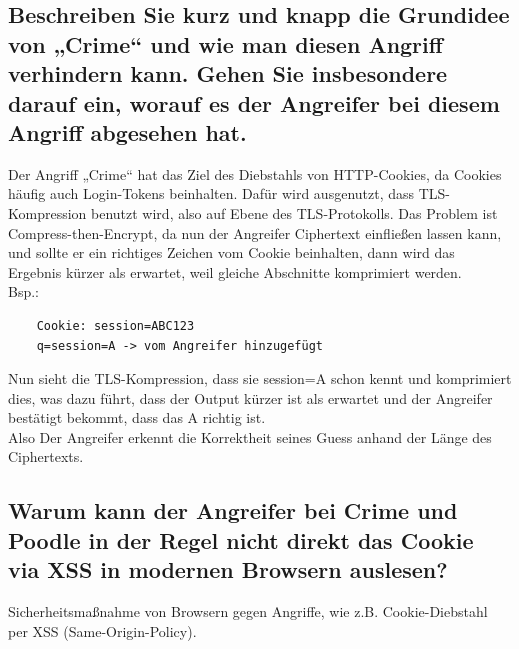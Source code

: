 \subsection{Beschreiben Sie kurz und knapp die Grundidee von „Crime“ und wie man diesen Angriff verhindern kann. Gehen Sie insbesondere darauf ein, worauf es der Angreifer bei diesem Angriff abgesehen hat.}
Der Angriff „Crime“ hat das Ziel des Diebstahls von HTTP-Cookies, da Cookies häufig auch Login-Tokens beinhalten. Dafür wird ausgenutzt, dass TLS-Kompression benutzt wird, also auf Ebene des TLS-Protokolls. Das Problem ist Compress-then-Encrypt, da nun der Angreifer Ciphertext einfließen lassen kann, und sollte er ein richtiges Zeichen vom Cookie beinhalten, dann wird das Ergebnis kürzer als erwartet, weil gleiche Abschnitte komprimiert werden. \\
Bsp.:\\
\begin{verbatim}
    Cookie: session=ABC123
    q=session=A -> vom Angreifer hinzugefügt
\end{verbatim}
Nun sieht die TLS-Kompression, dass sie session=A schon kennt und komprimiert dies, was dazu führt, dass der Output kürzer ist als erwartet und der Angreifer bestätigt bekommt, dass das A richtig ist.\\
Also Der Angreifer erkennt die Korrektheit seines Guess anhand der Länge des Ciphertexts.

\subsection{Warum kann der Angreifer bei Crime und Poodle in der Regel nicht direkt das Cookie via XSS in modernen Browsern auslesen?}
Sicherheitsmaßnahme von Browsern gegen Angriffe, wie z.B. Cookie-Diebstahl per XSS (Same-Origin-Policy). 